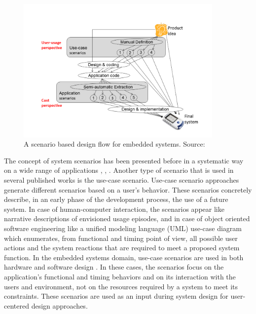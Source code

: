 \begin{figure}[!t]
	\centering
	\includegraphics[width=0.9\textwidth]{Images/versus2.pdf}	
	\caption{A scenario based design flow for embedded systems. Source: \cite{GheoThesis} }
	\label{fig:versus}
\end{figure}

The concept of system scenarios has been presented before in a systematic way on a wide range of applications \cite{GheoThesis}, \cite{tcm}, \cite{Gheorghita2007}.
Another type of scenario that is used in several published works is the use-case scenario.
Use-case scenario approaches generate different scenarios based on a user's behavior.
These scenarios concretely describe, in an early phase of the development process, the use of a future system. 
In case of human-computer interaction, the scenarios appear like narrative descriptions of envisioned usage episodes, and in case of object oriented software engineering like a unified modeling language (UML)  use-case diagram which enumerates, from functional and timing point of view, all possible user actions and the system reactions that are required to meet a proposed system function. 
In the embedded systems domain, use-case scenarios are used in both hardware \cite{52} \cite{85} and software design \cite{29}. 
In these cases, the scenarios focus on the application’s functional and timing behaviors and on its interaction with the users and environment, not on the resources required by a system to meet its constraints. 
These scenarios are used as an input during system design for user-centered design approaches.	


